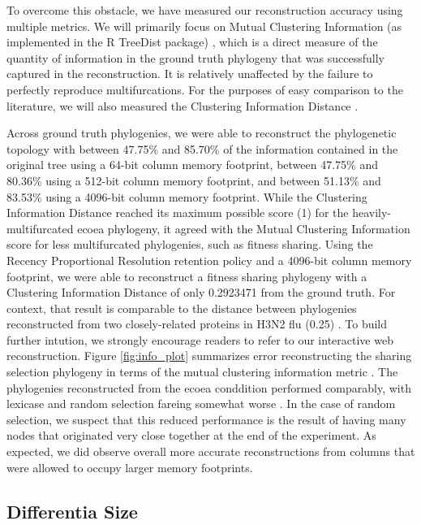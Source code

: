 To overcome this obstacle, we have measured our reconstruction accuracy using multiple metrics. 
We will primarily focus on Mutual Clustering Information (as implemented in the R TreeDist package) \citep{smith2020treedist}, which is a direct measure of the quantity of information in the ground truth phylogeny that was successfully captured in the reconstruction.
It is relatively unaffected by the failure to perfectly reproduce multifurcations.
For the purposes of easy comparison to the literature, we will also measured the Clustering Information Distance \citep{smith2020treedist}.



Across ground truth phylogenies, we were able to reconstruct the phylogenetic topology with between 47.75\% and 85.70\% of the information contained in the original tree using a 64-bit column memory footprint, between 47.75\% and 80.36\% using a 512-bit column memory footprint, and between 51.13\% and 83.53\% using a 4096-bit column memory footprint.
While the Clustering Information Distance reached its maximum possible score (1) for the heavily-multifurcated ecoea phylogeny, it agreed with the Mutual Clustering Information score for less multifurcated phylogenies, such as fitness sharing. 
Using the Recency Proportional Resolution retention policy and a 4096-bit column memory footprint, we were able to reconstruct a fitness sharing phylogeny with a Clustering Information Distance of only 0.2923471 from the ground truth. 
For context, that result is comparable to the distance between phylogenies reconstructed from two closely-related proteins in H3N2 flu (0.25) \citep{jones2021parallel}.
To build further intution, we strongly encourage readers to refer to our interactive web reconstruction.
Figure \ref{fig:info_plot} summarizes error reconstructing the sharing selection phylogeny in terms of the mutual clustering information metric \citep{smith2022robust}.
The phylogenies reconstructed from the ecoea conddition performed comparably, with lexicase and random selection fareing somewhat worse \citep{moreno2022hstratconceptsupplement}. %
In the case of random selection, we suspect that this reduced performance is the result of having many nodes that originated very close together at the end of the experiment.
As expected, we did observe overall more accurate reconstructions from columns that were allowed to occupy larger memory footprints.

\subsection{Differentia Size}

